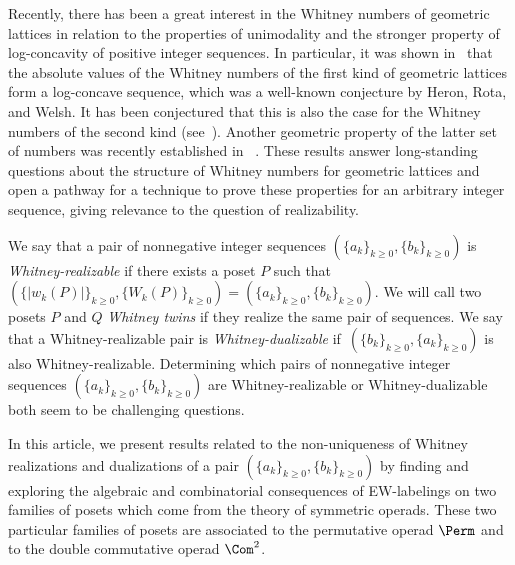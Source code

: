 Recently, there has been a great interest in the Whitney numbers of geometric lattices in relation to the properties of unimodality and the stronger property of log-concavity of positive integer sequences. In particular, it was shown in~\cite{AdiprasitoHuhKatz2018} that the absolute values of the Whitney numbers of the first kind of geometric lattices form a log-concave sequence, which was a well-known  conjecture by Heron, Rota, and Welsh. It has been conjectured that this is also the case for the Whitney numbers of the second kind (see~\cite[page 289]{Welsh1976}). Another geometric property of the latter set of numbers was recently established in ~\cite{BradenHuhMatherneProudfootWang2022}. These results answer long-standing questions about the structure of Whitney numbers for geometric lattices and open a pathway for a technique to prove these properties for an arbitrary integer sequence, giving relevance to the question of realizability. 

We say that a pair of nonnegative integer sequences $(\{a_k\}_{k\ge 0},\{b_k\}_{k\ge 0})$ is \emph{Whitney-realizable} if there exists a poset $P$ such that $(\{|w_k(P)|\}_{k\ge 0},\{W_k(P)\}_{k\ge 0})=(\{a_k\}_{k\ge 0},\{b_k\}_{k\ge 0})$. We will call two posets $P$ and $Q$ \emph{Whitney twins} if they realize the same pair of sequences. We say that a Whitney-realizable pair is \emph{Whitney-dualizable} if~$(\{b_k\}_{k\ge 0},\{a_k\}_{k\ge 0})$ is also Whitney-realizable.
Determining which pairs of nonnegative integer sequences $(\{a_k\}_{k\ge 0},\{b_k\}_{k\ge 0})$ are Whitney-realizable or Whitney-dualizable both seem to be challenging questions.

  
In this article, we present results related to the non-uniqueness of Whitney realizations and dualizations of a pair $(\{a_k\}_{k\ge 0},\{b_k\}_{k\ge 0})$ by finding and exploring the algebraic and combinatorial consequences of EW-labelings on two families of posets which come from the theory of symmetric operads. These two particular families of posets are associated to the permutative operad $\Perm$ and to the double commutative operad $\Com^2$.

  

